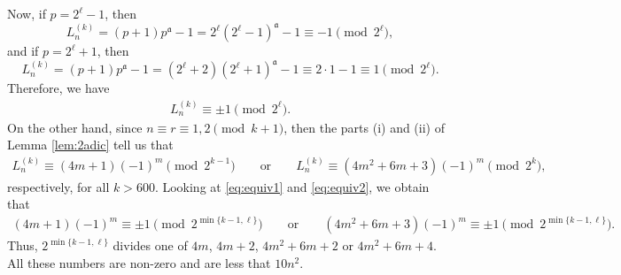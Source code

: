 \documentclass[11pt,a4paper]{article}
\numberwithin{equation}{section}
\numberwithin{table}{section}
\numberwithin{figure}{section}
\begin{document}
Now, if $p=2^\ell -1$, then 
$$L_n^{(k)} = (p+1)p^\mathfrak{a}-1 = 2^\ell (2^\ell -1)^\mathfrak{a} -1 \equiv -1 \pmod {2^\ell},$$
 and if $p=2^\ell +1$, then 
 $$L_n^{(k)} = (p+1)p^\mathfrak{a}-1 = (2^\ell +2) (2^\ell +1)^\mathfrak{a} -1 \equiv 2\cdot 1-1\equiv 1 \pmod {2^\ell}.$$
 Therefore, we have
 \begin{align}\label{eq:equiv1}
 L_n^{(k)} \equiv \pm 1 \pmod {2^\ell}.	
 \end{align}
On the other hand, since $n\equiv r \equiv 1,2 \pmod {k+1}$, then the parts (i) and (ii) of Lemma \ref{lem:2adic} tell us that
\begin{align}\label{eq:equiv2}
	L_n^{(k)} \equiv (4m+1)(-1)^m\pmod {2^{k-1}} \qquad \text{or} \qquad L_n^{(k)} \equiv (4m^2+6m+3)(-1)^m\pmod {2^{k}},
\end{align}
respectively, for all $k>600$. Looking at \eqref{eq:equiv1} and \eqref{eq:equiv2}, we obtain that 
\begin{align*}
	 (4m+1)(-1)^m\equiv \pm 1 \pmod {2^{\min\{k-1,\ell\}}} \qquad \text{or} \qquad  
	 (4m^2+6m+3)(-1)^m \equiv \pm 1 \pmod {2^{\min\{k-1,\ell\}}}.
\end{align*}
Thus, $2^{\min\{k-1,\ell\}}$ divides one of $4m$, $4m+2$, $4m^2+6m+2$ or $4m^2+6m+4$. All these numbers are non-zero and are less that $10n^2$.

\medskip
\end{document}
